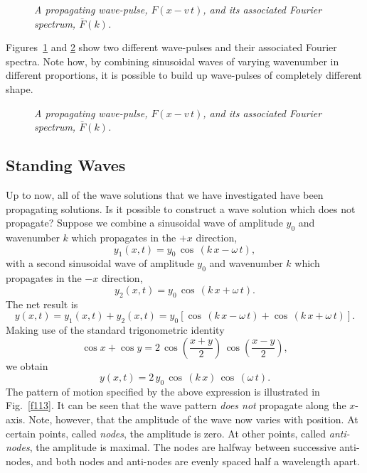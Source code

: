 \begin{figure}
\epsfysize=5in
\centerline{}
\caption{\em A propagating wave-pulse, $F(x-v\,t)$, and its
associated Fourier spectrum, $\bar{F}(k)$.}\label{f111}  
\end{figure}

Figures~\ref{f111} and \ref{f112} show two different wave-pulses and their associated
Fourier spectra. Note how, by combining sinusoidal waves of varying wavenumber in different proportions,
it is possible to build up  wave-pulses of completely different shape.

\begin{figure}
\epsfysize=5in
\centerline{}
\caption{\em A propagating wave-pulse, $F(x-v\,t)$, and its
associated Fourier spectrum, $\bar{F}(k)$.}\label{f112}  
\end{figure}

\subsection{Standing Waves}
Up to now, all of the wave solutions that we have investigated have been propagating
solutions. Is it possible to construct a wave solution which does not propagate?
Suppose we combine a sinusoidal wave of amplitude $y_0$ and wavenumber $k$ which
propagates in the $+x$ direction,
\begin{equation}
y_1(x,t) = y_0\,\cos\,(k\,x-\omega\,t),
\end{equation}
with a second sinusoidal wave of amplitude $y_0$ and wavenumber $k$ which
propagates in the $-x$ direction,
\begin{equation}
y_2(x,t) = y_0\,\cos\,(k\,x+\omega\,t).
\end{equation}
The net result is
\begin{equation}
y(x,t) = y_1(x,t)+y_2(x,t) = y_0\left[\cos\,(k\,x-\omega\,t)+\cos\,(k\,x+\omega\,t)\right].
\end{equation}
Making use of the standard trigonometric identity
\begin{equation}
\cos x + \cos y = 2\, \cos\left(\frac{x+y}{2}\right) \, \cos\left(\frac{x-y}{2}\right),
\end{equation}
we obtain
\begin{equation}
y(x,t) = 2\,y_0\,\cos \,(k\,x)\,\cos\,(\omega\,t).
\end{equation}
The pattern of motion specified by the above expression is illustrated in Fig.~\ref{f113}.
It can be seen that the wave pattern {\em does not} propagate along the $x$-axis. Note,
however, that the amplitude of the wave now varies with position. At certain points,
called {\em nodes}, the amplitude is zero. At other points, called {\em anti-nodes}, the amplitude
is maximal. The nodes are halfway between successive anti-nodes, and both nodes and
anti-nodes are evenly spaced half a wavelength apart. 

